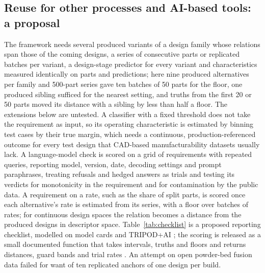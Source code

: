 \documentclass[pdflatex,sn-basic,lineno]{sn-jnl}
\begin{document}
\subsection{Reuse for other processes and AI-based tools: a proposal}\label{sec:reuse}

The framework needs several produced variants of a design family whose relations span those of the coming designs, a series of consecutive parts or replicated batches per variant, a design-stage predictor for every variant and characteristics measured identically on parts and predictions; here nine produced alternatives per family and 500-part series gave ten batches of 50 parts for the floor, one produced sibling sufficed for the nearest setting, and truths from the first 20 or 50 parts moved its distance with a sibling by less than half a floor. The extensions below are untested. A classifier with a fixed threshold does not take the requirement as input, so its operating characteristic is estimated by binning test cases by their true margin, which needs a continuous, production-referenced outcome for every test design that CAD-based manufacturability datasets usually lack. A language-model check is scored on a grid of requirements with repeated queries, reporting model, version, date, decoding settings and prompt paraphrases, treating refusals and hedged answers as trials and testing its verdicts for monotonicity in the requirement and for contamination by the public data. A requirement on a rate, such as the share of split parts, is scored once each alternative's rate is estimated from its series, with a floor over batches of rates; for continuous design spaces the relation becomes a distance from the produced designs in descriptor space. Table~\ref{tab:checklist} is a proposed reporting checklist, modelled on model cards \citep{mitchell2019model} and TRIPOD+AI \citep{collins2024tripod}; the scoring is released as a small documented function that takes intervals, truths and floors and returns distances, guard bands and trial rates \citep{canseven2026archive}. An attempt on open powder-bed fusion data \citep{leirmo2021data} failed for want of ten replicated anchors of one design per build.
\end{document}
